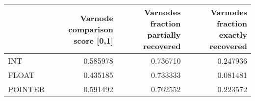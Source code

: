 \begin{tabular}{lrrr}
\toprule
{} &  Varnode comparison score [0,1] &  Varnodes fraction partially recovered &  Varnodes fraction exactly recovered \\
\midrule
INT     &                        0.585978 &                               0.736710 &                             0.247936 \\
FLOAT   &                        0.435185 &                               0.733333 &                             0.081481 \\
POINTER &                        0.591492 &                               0.762552 &                             0.223572 \\
\bottomrule
\end{tabular}
